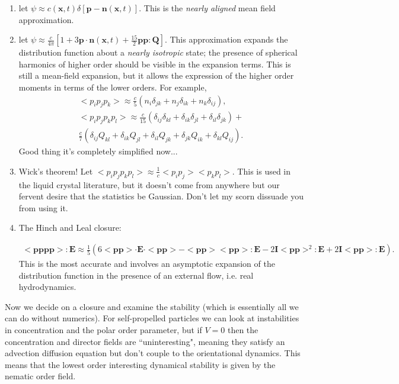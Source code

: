 \documentclass[onecolumn,showpacs,preprintnumbers,prl,amsmath,amssymb]{revtex4-1}
\def\b{\mathbf}
\begin{document}
\begin{enumerate}\label{eq:closures}
\item let $\psi\approx c(\b{x},t)\delta\left[\b{p}-\b{n}(\b{x},t)\right]$. This is the {\it nearly aligned} mean field approximation.
\item let $\psi\approx\frac{c}{4\pi}\left[1+3\b{p}\cdot\b{n}(\b{x},t)+\frac{15}{2}\b{pp:Q}\right]$. This approximation expands the distribution function about a {\it nearly isotropic} state; the presence of spherical harmonics of higher order should be visible in the expansion terms. This is still a mean-field expansion, but it allows the expression of the higher order moments in terms of the lower orders. For example,
\begin{gather}
<p_ip_jp_k>\approx\frac{c}{5}(n_i\delta_{jk}+n_j\delta_{ik}+n_k\delta_{ij}),\\
<p_ip_jp_kp_l>\approx\frac{c}{15}(\delta_{ij}\delta_{kl}+\delta_{ik}\delta_{jl}+\delta_{il}\delta_{jk})+\\
\nonumber \frac{c}{7}(\delta_{ij}Q_{kl}+\delta_{ik}Q_{jl}+\delta_{il}Q_{jk}+\delta_{jk}Q_{ik}+\delta_{kl}Q_{ij}).
\end{gather}
Good thing it's completely simplified now...

\item Wick's theorem! Let $<p_ip_jp_kp_l>\approx\frac{1}{c}<p_ip_j><p_kp_l>$. This is used in the liquid crystal literature, but it doesn't come from anywhere but our fervent desire that the statistics be Gaussian. Don't let my scorn dissuade you from using it.

\item The Hinch and Leal closure:

\begin{gather}
<\b{pppp}>:\b{E}\approx\frac{1}{5}(6<\b{pp}>\cdot \b{E}\cdot<\b{pp}>-<\b{pp}><\b{pp}>:\b{E}-2 \b{I} <\b{pp}>^2:\b{E}+2 \b{I}<\b{pp}>:\b{E}).
\end{gather}
This is the most accurate and involves an asymptotic expansion of the distribution function in the presence of an external flow, i.e. real hydrodynamics.
\end{enumerate}

Now we decide on a closure and examine the stability (which is essentially all we can do without numerics). For self-propelled particles we can look at instabilities in concentration and the polar order parameter, but if $V=0$ then the concentration and director fields are ``uninteresting", meaning they satisfy an advection diffusion equation but don't couple to the orientational dynamics. This means that the lowest order interesting dynamical stability is given by the nematic order field.
\end{document}
